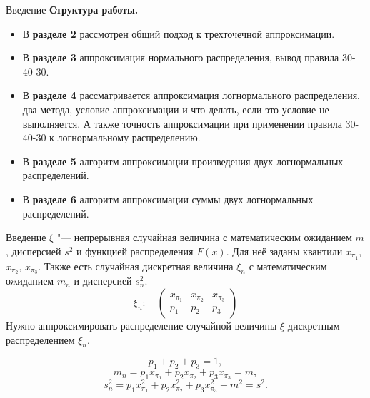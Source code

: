 \documentclass[ucs, notheorems, handout]{beamer}
\begin{document}
\begin{frame}{Введение}
	\textbf{Структура работы.}
	\begin{itemize}
		\item В \textbf{разделе 2} рассмотрен общий подход к трехточечной аппроксимации.
		\item В \textbf{разделе 3} аппроксимация нормального распределения, вывод правила 30-40-30.
		\item В \textbf{разделе 4} рассматривается аппроксимация логнормального распределения, два метода, условие аппроксимации и что делать, если это условие не выполняется. А также точность аппроксимации при применении правила 30-40-30 к логнормальному распределению.
		\item В \textbf{разделе 5} алгоритм аппроксимации произведения двух логнормальных распределений.
		\item В \textbf{разделе 6} алгоритм аппроксимации суммы двух логнормальных распределений.
	\end{itemize}
\end{frame}
	
	\begin{frame}{Введение}
		$\xi$ "--- непрерывная случайная величина с математическим ожиданием $m$, дисперсией $s^{2}$ и функцией распределения $F(x)$. Для неё заданы квантили $x_{\pi_{1}}$, $x_{\pi_{2}}$, $x_{\pi_{3}}$. Также есть случайная дискретная величина $\xi_{n}$ с математическим ожиданием $m_{n}$ и дисперсией $s^{2}_{n}$.
		\[\xi_{n}:\quad\begin{pmatrix} 
			x_{\pi_{1}}&x_{\pi_{2}}&x_{\pi_{3}}\\ 
			p_{1} &  p_{2}  & p_{3}
		\end{pmatrix}\]
		Нужно аппроксимировать распределение случайной величины $\xi$ дискретным распределением $\xi_{n}$.
		
		\begin{equation*}
			p_{1} + p_{2} + p_{3} = 1, \label{1}
		\end{equation*}
		\begin{equation*}
			m_{n} = p_{1}x_{\pi_{1}} + p_{2}x_{\pi_{2}} + p_{3}x_{\pi_{3}} = m, \label{2}
		\end{equation*}
		\begin{equation*}
			s_{n}^{2} = p_{1} x_{\pi_{1}}^{2} + p_{2} x_{\pi_{2}}^{2} + p_{3} x_{\pi_{3}}^{2} - m^{2} = s^{2}. \label{3}
		\end{equation*}
		
		
	\end{frame}
\end{document}
